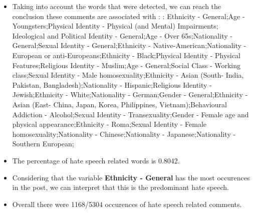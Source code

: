 \documentclass[11pt]{article}
\begin{document}
\begin{itemize}\item Taking into account the words that were detected, we can reach the conclusion these comments are associated with : : Ethnicity - General;Age - Youngsters;Physical Identity - Physical (and Mental) Impairments; Ideological and Political Identity - General;Age - Over 65s;Nationality - General;Sexual Identity - General;Ethnicity - Native-American;Nationality - European or anti-Europeans;Ethnicity - Black;Physical Identity - Physical Features;Religious Identity - Muslim;Age - General;Social Class - Working class;Sexual Identity - Male homosexuality;Ethnicity - Asian (South- India, Pakistan, Bangladesh);Nationality - Hispanic;Religious Identity - Jewish;Ethnicity - White;Nationality - German;Gender - General;Ethnicity - Asian (East- China, Japan, Korea, Philippines, Vietnam);Behavioural Addiction - Alcohol;Sexual Identity - Transexuality;Gender - Female age and physical appearance;Ethnicity - Roma;Sexual Identity - Female homosexuality;Nationality - Chinese;Nationality - Japanese;Nationality - Southern European;%

\item The percentage of hate speech related words is 0.8042.

\item Considering that the variable \textbf{Ethnicity - General} has the most occurences in the post, we can interpret that this is the predominant hate speech.

\item Overall there were 1168/5304 occurences of hate speech related comments.\end{itemize}
\end{document}
